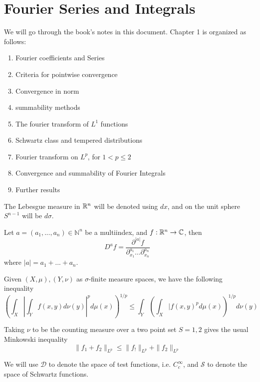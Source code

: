 \chapter{Fourier Series and Integrals}

We will go through the book's notes in this document.
Chapter 1 is organized as follows:
\begin{enumerate}
    \item Fourier coefficients and Series
    \item Criteria for pointwise convergence
    \item Convergence in norm
    \item summability methods
    \item The fourier transform of $L^1$ functions
    \item Schwartz class and tempered distributions
    \item Fourier transform on $L^p$, for $1<p\leq 2$
    \item Convergence and summability of Fourier Integrals
    \item Further results
\end{enumerate}

The Lebesgue measure in $\mathbb{R}^n$ will be denoted using $dx$, and on the unit sphere $S^{n-1}$ will be $d\sigma$.

Let $a=(a_1, ..., a_n)\in\mathbb{N}^n$ be a multiindex, and $f:\mathbb{R}^n\to\mathbb{C}$, then
\begin{equation*}
    D^af=\frac{\partial^{|a|}f}{\partial_{x_1}^{a_1}...\partial_{x_n}^{a_n}}
\end{equation*}
where $|a|=a_1+...+a_n$.


\begin{theorem}
    Given $(X,\mu), (Y,\nu)$ as $\sigma$-finite measure spaces, we have the following inequality
    \begin{equation*}
        \left(\int_X\left|\int_Yf(x,y)d\nu(y) \right|^pd\mu(x) \right)^{1/p}\leq\int_Y \left(\int_X|f(x,y)^pd\mu(x) \right)^{1/p}d\nu(y)
    \end{equation*}
\end{theorem}

Taking $\nu$ to be the counting measure over a two point set $S={1,2}$ gives the usual Minkowski inequality
\begin{equation*}
    \|f_1+f_2\|_{L^p}\leq\|f_!\|_{L^p}+\|f_2\|_{L^p}
\end{equation*}

We will use $\mathcal{D}$ to denote the space of test functions, i.e. $C_c^\infty$, and $\mathcal{S}$ to denote the space of Schwartz functions. 